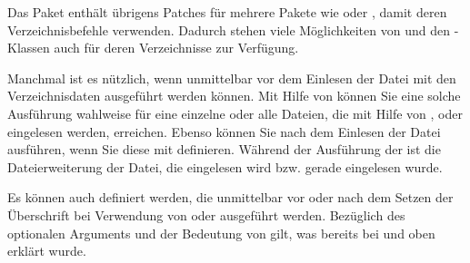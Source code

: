 Das Paket \hyperref[cha:scrhack]{}%
 enthält übrigens
Patches für mehrere Pakete wie  oder
, damit deren Verzeichnisbefehle
 verwenden. Dadurch stehen viele Möglichkeiten von
 und den \KOMAScript-Klassen auch für deren Verzeichnisse
zur Verfügung.%
\EndIndexGroup


\begin{Declaration}
\end{Declaration}
Manchmal ist es nützlich, wenn unmittelbar vor dem Einlesen der Datei mit den
Verzeichnisdaten  ausgeführt werden können. Mit Hilfe von
 können Sie eine solche Ausführung
wahlweise für eine einzelne  oder alle Dateien, die
mit Hilfe von ,
 oder 
eingelesen werden, erreichen. Ebenso können Sie  nach dem
Einlesen der Datei ausführen, wenn Sie diese mit 
definieren. Während der Ausführung der  ist
 die
Dateierweiterung der Datei, die eingelesen wird bzw. gerade eingelesen wurde.%
\EndIndexGroup


\begin{Declaration}
\end{Declaration}
Es können auch  definiert werden, die unmittelbar vor oder
nach dem Setzen der Überschrift bei Verwendung von
 oder 
ausgeführt werden. Bezüglich des optionalen Arguments und der Bedeutung von
 gilt, was
bereits bei  und
 oben erklärt wurde.%
\EndIndexGroup



